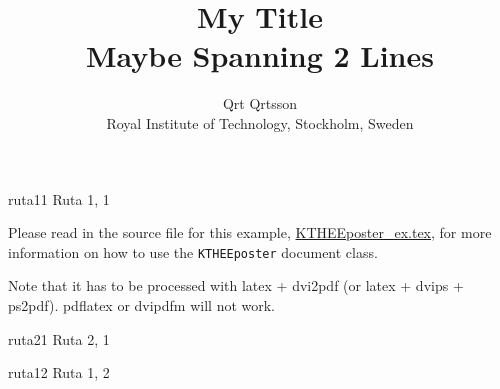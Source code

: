 \documentclass[portrait]{KTHEEposter}
\begin{document}
\title{My Title \\
  Maybe Spanning 2 Lines}
\author{Qrt Qrtsson \\
    Royal Institute of Technology, Stockholm, Sweden}
\maketitle

\begin{rutor}{3}


  
  \begin{ruta}{1}{ruta11}
    Ruta 1, 1

    Please read in the source file for this example,
    \url{KTHEEposter_ex.tex}, for more information on how to use
    the \texttt{KTHEEposter} document class. 

    Note that it has to be processed with latex + dvi2pdf (or latex +
    dvips + ps2pdf). pdflatex or dvipdfm will not work.
    
  \end{ruta}
  
  \begin{ruta}{1}{ruta21}
    Ruta 2, 1
  \end{ruta}
  
  \begin{ruta}[4]{1}{ruta12}
    Ruta 1, 2
  \end{ruta}
  

\end{rutor}
\end{document}
